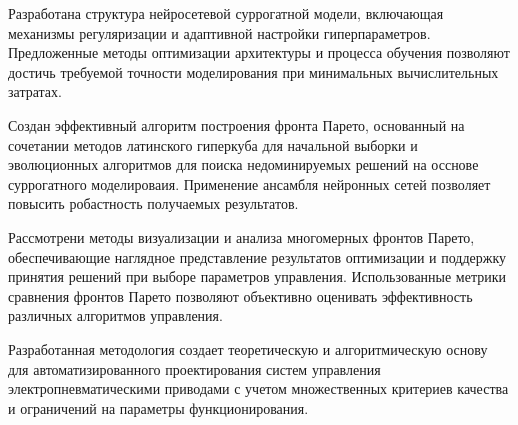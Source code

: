 Разработана структура нейросетевой суррогатной модели, включающая механизмы регуляризации и адаптивной настройки
гиперпараметров. Предложенные методы оптимизации архитектуры и процесса обучения позволяют достичь требуемой точности моделирования при минимальных вычислительных затратах.

Создан эффективный алгоритм построения фронта Парето, основанный на сочетании методов
латинского гиперкуба для начальной выборки и эволюционных алгоритмов для поиска недоминируемых
решений на осснове суррогатного моделироваия. Применение ансамбля нейронных сетей позволяет повысить робастность получаемых результатов.

Рассмотрени методы визуализации и анализа многомерных фронтов Парето, обеспечивающие наглядное
представление результатов оптимизации и поддержку принятия решений при выборе параметров управления. Использованные метрики
сравнения фронтов Парето позволяют объективно оценивать эффективность различных алгоритмов управления.

Разработанная методология создает теоретическую и алгоритмическую основу для
автоматизированного проектирования систем управления электропневматическими
приводами с учетом множественных критериев качества и ограничений на параметры функционирования.

